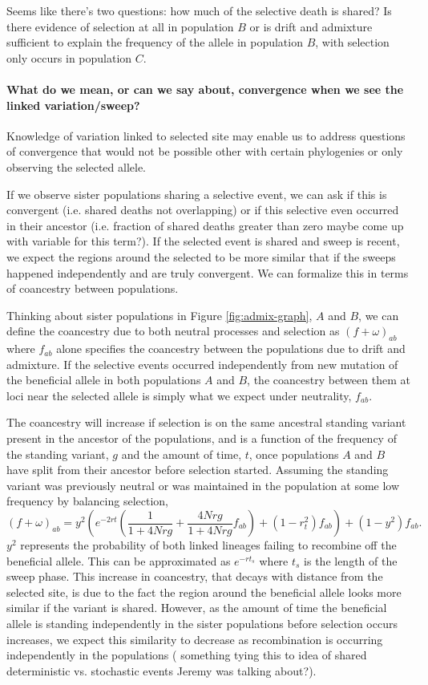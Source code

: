 \documentclass[a4paper,10pt]{article}
\newcommand{\kl}[1]{{\color{orange} #1}}
\begin{document}
Seems like there's two questions: how much of
the selective death is shared? Is there evidence of selection at all
in population $B$ or is drift and admixture sufficient to explain the
frequency of the allele in population $B$, with selection only occurs
in population $C$.

\paragraph{What do we mean, or can we say about, convergence when we see the linked variation/sweep?}
Knowledge of variation linked to selected site may enable us to address questions of convergence that would not be possible other with certain phylogenies or only observing the selected allele.

If we observe sister populations sharing a selective event, we can ask if this is convergent (i.e. shared deaths not overlapping) or if this selective even occurred in their ancestor (i.e. fraction of shared deaths greater than zero \kl{maybe come up with variable for this term?}). If the selected event is shared and sweep is recent, we expect the regions around the selected to be more similar that if the sweeps happened independently and are truly convergent. We can formalize this in terms of coancestry between populations.

Thinking about sister populations in Figure \ref{fig:admix-graph}, $A$ and $B$, we can define the coancestry due to both neutral processes and selection as $(f + \omega)_{ab}$ where $f_{ab}$ alone specifies the coancestry between the populations due to drift and admixture.
If the selective events occurred independently from new mutation of the beneficial allele in both populations $A$ and $B$, the coancestry between them at loci near the selected allele is simply what we expect under neutrality, $f_{ab}$.

The coancestry will increase if selection is on the same ancestral standing variant present in the ancestor of the populations, and is a function of the frequency of the standing variant, $g$ and the amount of time, $t$, once populations $A$ and $B$ have split from their ancestor before selection started. Assuming the standing variant was previously neutral or was maintained in the population at some low frequency by balancing selection,
\begin{equation} 
(f+\omega)_{ab} = y^2 \left(e^{-2rt} \left(\frac{1}{1+4Nrg}+ \frac{4Nrg}{1+4Nrg}f_{ab} \right) + (1-r_t^2)f_{ab} \right) + (1-y^2)f_{ab}. 
\end{equation}
$y^2$ represents the probability of both linked lineages failing to recombine off the beneficial allele. This can be approximated as $e^{-rt_s}$ where $t_s$ is the length of the sweep phase. This increase in coancestry, that decays with distance from the selected site, is due to the fact the region around the beneficial allele looks more similar if the variant is shared. However, as the amount of time the beneficial allele is standing independently in the sister populations before selection occurs increases, we expect this similarity to decrease as recombination is occurring independently in the populations (\kl{something tying this to idea of shared deterministic vs. stochastic events Jeremy was talking about?}).
\end{document}
